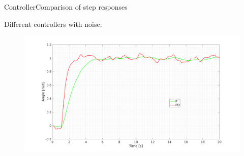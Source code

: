 \begin{frame}{Controller}{Comparison of step responses}
  \begin{block}{Different controllers with noise:}

	  \begin{figure}
        \includegraphics[scale=0.20]{../report/figures/PD_noise.png}
      \end{figure}
  
  \end{block}
\end{frame}

